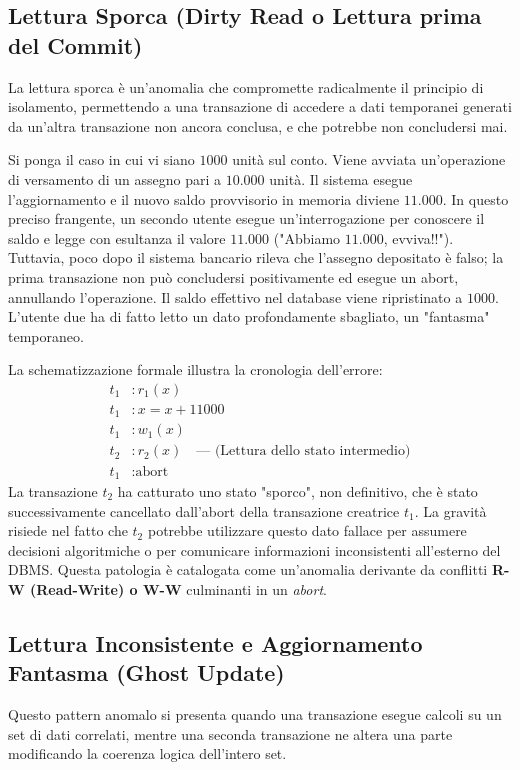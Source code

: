 \subsection{Lettura Sporca (Dirty Read o Lettura prima del Commit)}

La lettura sporca è un'anomalia che compromette radicalmente il principio di isolamento, permettendo a una transazione di accedere a dati temporanei generati da un'altra transazione non ancora conclusa, e che potrebbe non concludersi mai.

Si ponga il caso in cui vi siano $1000$ unità sul conto.
Viene avviata un'operazione di versamento di un assegno pari a $10.000$ unità. Il sistema esegue l'aggiornamento e il nuovo saldo provvisorio in memoria diviene $11.000$.
In questo preciso frangente, un secondo utente esegue un'interrogazione per conoscere il saldo e legge con esultanza il valore $11.000$ ("Abbiamo $11.000$, evviva!!").
Tuttavia, poco dopo il sistema bancario rileva che l'assegno depositato è falso; la prima transazione non può concludersi positivamente ed esegue un abort, annullando l'operazione. Il saldo effettivo nel database viene ripristinato a $1000$. L'utente due ha di fatto letto un dato profondamente sbagliato, un "fantasma" temporaneo.

La schematizzazione formale illustra la cronologia dell'errore:
\begin{align*}
    t_1&: r_1(x) \\
    t_1&: x = x + 11000 \\
    t_1&: w_1(x) \\
    t_2&: r_2(x) \quad \text{--- (Lettura dello stato intermedio)} \\
    t_1&: \text{abort}
\end{align*}
La transazione $t_2$ ha catturato uno stato "sporco", non definitivo, che è stato successivamente cancellato dall'abort della transazione creatrice $t_1$. La gravità risiede nel fatto che $t_2$ potrebbe utilizzare questo dato fallace per assumere decisioni algoritmiche o per comunicare informazioni inconsistenti all'esterno del DBMS. Questa patologia è catalogata come un'anomalia derivante da conflitti \textbf{R-W (Read-Write) o W-W} culminanti in un \textit{abort}.

\subsection{Lettura Inconsistente e Aggiornamento Fantasma (Ghost Update)}

Questo pattern anomalo si presenta quando una transazione esegue calcoli su un set di dati correlati, mentre una seconda transazione ne altera una parte modificando la coerenza logica dell'intero set.

